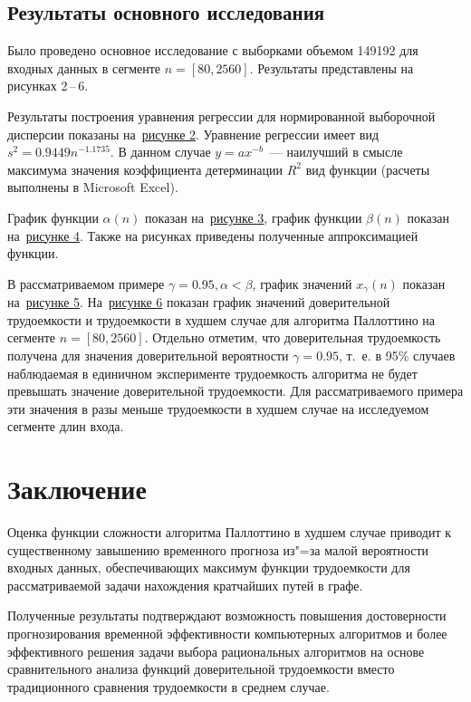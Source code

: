 \documentclass[a4paper,fontsize=14pt]{article}
\begin{document}
\subsection{Результаты основного исследования} \label{subsec:results_part_2}

Было проведено основное исследование с выборками объемом 149192 для входных данных в сегменте $n = [80, 2560]$. Результаты представлены на рисунках 2\,--\,6.

Результаты построения уравнения регрессии для нормированной выборочной дисперсии показаны на~\hyperref[image2]{рисунке 2}. Уравнение регрессии имеет вид $s^2 = 0.9449n^{-1.1735}$. В данном случае $y = ax^{-b}$~--- наилучший в смысле максимума значения коэффициента детерминации $R^2$ вид функции (расчеты выполнены в Microsoft Excel).

График функции $\alpha(n)$ показан на~\hyperref[image3]{рисунке 3}, график функции $\beta(n)$ показан на~\hyperref[image4]{рисунке 4}. Также на рисунках приведены полученные аппроксимацией функции.

В рассматриваемом примере $\gamma = 0.95, \alpha < \beta$, график значений $x_\gamma(n)$ показан на~\hyperref[image5]{рисунке 5}. На~\hyperref[image6]{рисунке 6} показан график значений доверительной трудоемкости и трудоемкости в худшем случае для алгоритма Паллоттино на сегменте $n = [80, 2560]$. Отдельно отметим, что доверительная трудоемкость получена для значения доверительной вероятности $\gamma = 0.95$, т.~е. в 95\% случаев наблюдаемая в единичном эксперименте трудоемкость алгоритма не будет превышать значение доверительной трудоемкости. Для рассматриваемого примера эти значения в разы меньше трудоемкости в худшем случае на исследуемом сегменте длин входа.

\section{Заключение} \label{sec:conclusion}

Оценка функции сложности алгоритма Паллоттино в худшем случае приводит к существенному завышению временного прогноза из"=за малой вероятности входных данных, обеспечивающих максимум функции трудоемкости для рассматриваемой задачи нахождения кратчайших путей в графе.

Полученные результаты подтверждают возможность повышения достоверности прогнозирования временной эффективности компьютерных алгоритмов и более эффективного решения задачи выбора рациональных алгоритмов на основе сравнительного анализа функций доверительной трудоемкости вместо традиционного сравнения трудоемкости в среднем случае.
\end{document}
